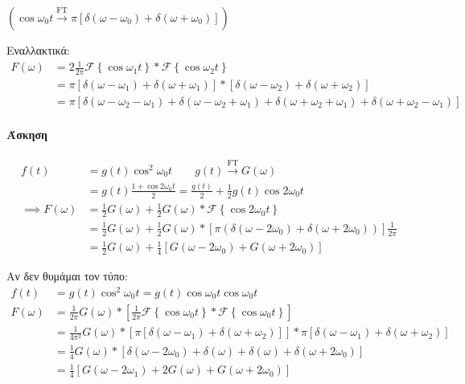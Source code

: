      \( \left( \cos\omega_0t \xrightarrow{\text{FT}}
     \pi\left[ \delta(\omega -\omega_0)+\delta(\omega+\omega_0) \right]
      \right) \)

     Εναλλακτικά:
     \begin{align*}
     F(\omega ) &= 2\frac{1}{2\pi}\mathscr F \left\lbrace \cos\omega_1 t \right\rbrace
     * \mathscr F\left\lbrace \cos\omega_2 t \right\rbrace \\
     &= \pi \left[ \delta(\omega -\omega_1)+\delta(\omega+\omega_1) \right]
     * \left[ \delta(\omega -\omega_2)+\delta(\omega+\omega_2) \right]
     \\ &= \pi \left[
     \delta(\omega-\omega_2-\omega_1) +\delta(\omega-\omega_2+\omega_1)
     +\delta(\omega+\omega_2+\omega_1)+\delta(\omega+\omega_2-\omega_1)
     \right]
     \end{align*}

     \paragraph{Άσκηση}
     \begin{align*}
     f(t) &= g(t) \cos^2 \omega_0 t \qquad g(t) \xrightarrow{\text{FT}} G(\omega )
     \\ &= g(t)\frac{1+\cos2\omega_0 t}{2} = \frac{g(t)}{2} +
     \frac{1}{2}g(t)\cos2\omega_0 t \\
     \implies F(\omega ) &= \frac{1}{2}G(\omega )+\frac{1}{2}G(\omega )
     *\mathscr F\left\lbrace \cos2\omega_0 t \right\rbrace
     \\ &= \frac{1}{2}G(\omega )+\frac{1}{2}G(\omega ) *
     \left[ \pi\left(\delta(\omega-2\omega_0)+\delta(\omega+2\omega_0)\right) \right]
     \frac{1}{2\pi} \\ &= \frac{1}{2}G(\omega ) + \frac{1}{4} \left[
     G(\omega -2\omega_0)+G(\omega +2\omega_0)
     \right]
     \end{align*}

     Αν δεν θυμάμαι τον τύπο:
     \begin{align*}
     f(t) &= g(t)\cos^2\omega_0 t = g(t)\cos\omega_0 t\cos\omega_0 t \\
     F(\omega ) &= \frac{1}{2\pi}G(\omega)*\left[
     \frac{1}{2\pi}\mathscr F\left\lbrace \cos\omega_0t \right\rbrace
     *\mathscr F \left\lbrace \cos\omega_0 t \right\rbrace
     \right] \\ &= \frac{1}{4\pi^2} G(\omega ) * \left[
     \pi\left[ \delta(\omega -\omega_1)+\delta(\omega+\omega_2) \right]
     \right] * \pi\left[
     \delta(\omega-\omega_1)+\delta(\omega+\omega_2)
     \right] \\ &=
     \frac{1}{4}G(\omega ) * \left[
     \delta(\omega -2\omega_0)+\delta(\omega)+\delta(\omega)+\delta(\omega+2\omega_0)
     \right]
     \\ &= \frac{1}{4}\left[
     G(\omega -2\omega_1)+2G(\omega )+G(\omega +2\omega_0)
     \right]
     \end{align*}

